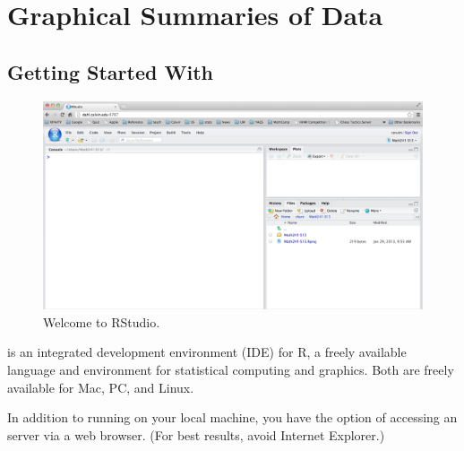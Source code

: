 \documentclass[twoside]{book}\usepackage[]{graphicx}\usepackage[]{xcolor}
\renewcommand{\code}[1]{{\color{blue!80!black}\texttt{#1}}}
\def\Chapter#1{%
\chapter{#1}
}
\def\R{{\sf R}}
\def\Rstudio{{\sf RStudio}}
\def\tab#1{{\sf #1}}
\begin{document}
\Chapter{Graphical Summaries of Data}



\section{Getting Started With \RStudio}

\begin{figure}
\begin{center}
\includegraphics[width = .85\textwidth]{images/RStudio-Welcome.png}
\end{center}
\caption{Welcome to \Rstudio.}
\label{fig:Rstudio-welcome}%
\end{figure}

\RStudio{} is an integrated development environment (IDE) for \R,  
a freely available language and environment for statistical computing and graphics.
Both are freely available for Mac, PC, and Linux.  

In addition to running \RStudio{} on your local machine, you have the option
of accessing an \RStudio{} server via a web browser.  (For best results, avoid 
Internet Explorer.)

% 
\end{document}
